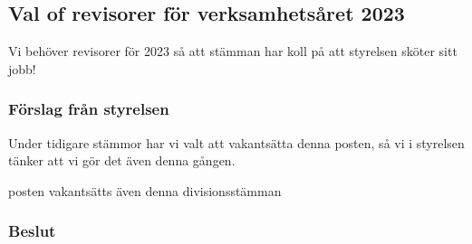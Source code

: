 \documentclass[protokoll]{dvd}
\begin{document}
\subsection{Val of revisorer för verksamhetsåret 2023}
Vi behöver revisorer för 2023 så att stämman har koll på att styrelsen sköter sitt jobb!

\subsubsection*{Förslag från styrelsen}
Under tidigare stämmor har vi valt att vakantsätta denna posten, så vi i styrelsen tänker
att vi gör det även denna gången.

\begin{attsatser}
    \item posten vakantsätts även denna divisionsstämman
\end{attsatser}

\subsubsection*{Beslut}





\end{document}
